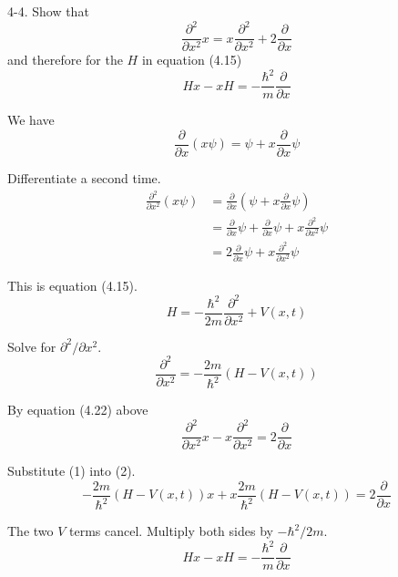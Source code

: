 \documentclass[12pt]{article}
\begin{document}
4-4.
Show that
\begin{equation*}
\frac{\partial^2}{\partial x^2}x=x\frac{\partial^2}{\partial x^2}+2\frac{\partial}{\partial x}
\tag{4.22}
\end{equation*}
and therefore for the $H$ in equation (4.15)
\begin{equation*}
Hx-xH=-\frac{\hbar^2}{m}\frac{\partial}{\partial x}
\end{equation*}

We have
\begin{equation*}
\frac{\partial}{\partial x}(x\psi)=\psi+x\frac{\partial}{\partial x}\psi
\end{equation*}

Differentiate a second time.
\begin{align*}
\frac{\partial^2}{\partial x^2}(x\psi)
&=\frac{\partial}{\partial x}\left(\psi+x\frac{\partial}{\partial x}\psi\right)
\\
&=\frac{\partial}{\partial x}\psi+\frac{\partial}{\partial x}\psi+x\frac{\partial^2}{\partial x^2}\psi
\\
&=2\frac{\partial}{\partial x}\psi+x\frac{\partial^2}{\partial x^2}\psi
\end{align*}

This is equation (4.15).
\begin{equation*}
H=-\frac{\hbar^2}{2m}\frac{\partial^2}{\partial x^2}+V(x,t)
\end{equation*}

Solve for $\partial^2/\partial x^2$.
\begin{equation*}
\frac{\partial^2}{\partial x^2}=-\frac{2m}{\hbar^2}(H-V(x,t))
\tag{1}
\end{equation*}

By equation (4.22) above
\begin{equation*}
\frac{\partial^2}{\partial x^2}x-x\frac{\partial^2}{\partial x^2}=2\frac{\partial}{\partial x}
\tag{2}
\end{equation*}

Substitute (1) into (2).
\begin{equation*}
-\frac{2m}{\hbar^2}(H-V(x,t))x+x\frac{2m}{\hbar^2}(H-V(x,t))=2\frac{\partial}{\partial x}
\end{equation*}

The two $V$ terms cancel.
Multiply both sides by $-\hbar^2/2m$.
\begin{equation*}
Hx-xH=-\frac{\hbar^2}{m}\frac{\partial}{\partial x}
\end{equation*}
\end{document}

